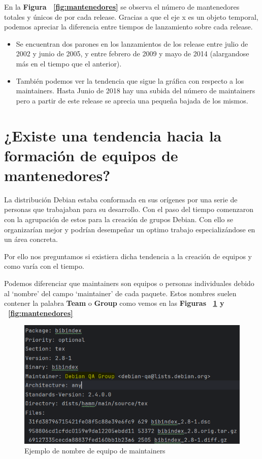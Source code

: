 \documentclass[a4paper, 12pt]{book}
\begin{document}
En la  \textbf{Figura ~\ref{fig:mantenedores}} se observa el número de mantenedores totales y únicos de por cada release. 
Gracias a que el eje x es un objeto temporal, podemos apreciar la diferencia entre tiempos de lanzamiento sobre cada release.
	\begin{itemize}
	\item  Se encuentran dos parones en los lanzamientos de los release entre julio de 2002 y junio de 2005, y entre febrero de 2009 y mayo de 2014 (alargandose más en el tiempo que el anterior).
	
	\item También podemos ver la tendencia que sigue la gráfica con respecto a los maintainers. Hasta Junio de 2018 hay una subida del número de maintainers pero a partir de este release se aprecia una pequeña bajada de los mismos.
\end{itemize}

\section{¿Existe una tendencia hacia la formación de equipos de mantenedores?}
\label{sec:pregunta_2}
La distribución Debian estaba conformada en sus orígenes por una serie de personas que trabajaban para su desarrollo. Con el paso del tiempo comenzaron con la agrupación de estos para la creación de grupos Debian. Con ello se organizarían mejor y podrían desempeñar un optimo trabajo especializándose en un área concreta.


Por ello nos preguntamos si existiera dicha tendencia a la creación de equipos y como varía con el tiempo.

Podemos diferenciar que maintainers son equipos o personas individuales debido al `nombre' del campo `maintainer' de cada paquete. Estos nombres suelen contener la palabra \textbf{Team} o \textbf{Group} como vemos en las \textbf{Figuras ~\ref{fig:ejemplo_equipo_1} y ~\ref{fig:mantenedores}}

\begin{figure}
	\centering
	\includegraphics[width=15cm, keepaspectratio]{img/Ejemplo equipo 1.png}
	\caption{Ejemplo de nombre de equipo de maintainers}
	\label{fig:ejemplo_equipo_1}
\end{figure}
\end{document}
